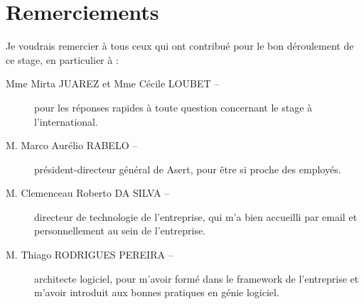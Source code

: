\chapter*{Remerciements}

Je voudrais remercier à tous ceux qui ont contribué pour le bon déroulement de ce stage, en particulier à :

\vspace{1em}

\begin{description}
\item[Mme Mirta JUAREZ et Mme Cécile LOUBET --] pour les réponses rapides à toute question concernant le stage à l'international.
\item[M. Marco Aurélio RABELO --] président-directeur général de Asert, pour être si proche des employés.
\item[M. Clemenceau Roberto DA SILVA --] directeur de technologie de l'entreprise, qui m'a bien accueilli par email et personnellement au sein de l'entreprise.
\item[M. Thiago RODRIGUES PEREIRA --] architecte logiciel, pour m'avoir formé dans le framework de l'entreprise et m'avoir introduit aux bonnes pratiques en génie logiciel.
\end{description}
